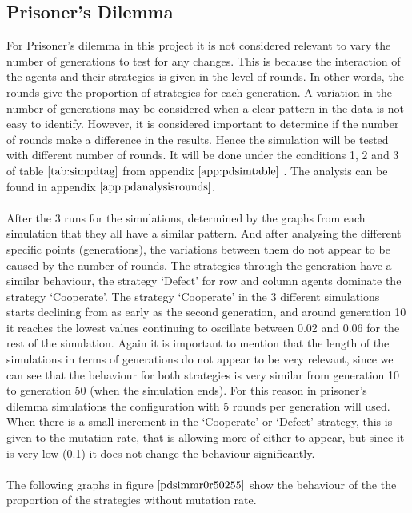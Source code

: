 \subsection{Prisoner's Dilemma}
For Prisoner's dilemma in this project it is not considered relevant to vary the number of generations to test for any changes. This is because the interaction of the agents and their strategies is given in the level of rounds. In other words, the rounds give the proportion of strategies for each generation. A variation in the number of generations may be considered when a clear pattern in the data is not easy to identify. However, it is considered important to determine if the number of rounds make a difference in the results. Hence the simulation will be tested  with different number of rounds. It will be done under the conditions 1, 2 and 3 of table $\ref{tab:simpdtag}$ from appendix $\ref{app:pdsimtable}$ . The analysis can be found in appendix $\ref{app:pdanalysisrounds}$.
\\\\After the 3 runs for the simulations, determined by the graphs from each simulation that they all have a similar pattern. And after analysing the different specific points (generations), the variations between them do not appear to be caused by the number of rounds. The strategies through the generation have a similar behaviour, the strategy `Defect' for row and column agents dominate the strategy `Cooperate'. The strategy `Cooperate' in the 3 different simulations starts declining from as early as the second generation, and around generation 10 it reaches the lowest values continuing to oscillate between 0.02 and 0.06 for the rest of the simulation. Again it is important to mention that the length of the simulations in terms of generations do not appear to be very relevant, since we can see that the behaviour for both strategies is very similar from generation 10 to generation 50 (when the simulation ends). For this reason in prisoner's dilemma simulations the configuration with 5 rounds per generation will used.
When there is a small increment in the `Cooperate' or `Defect' strategy, this is given to the mutation rate, that is allowing more of either to appear, but since it is very low (0.1) it does not change the behaviour significantly.
\\\\The following graphs in figure $\ref{pdsimmr0r50255}$ show the behaviour of the the proportion of the strategies without mutation rate.

